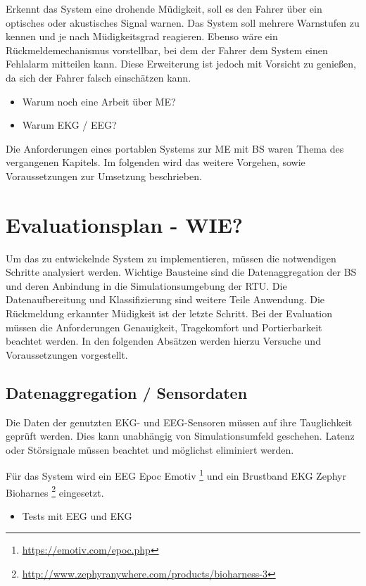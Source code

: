 {Erkennt das System eine drohende Müdigkeit, soll es den Fahrer über ein optisches oder akustisches Signal warnen. Das System soll mehrere Warnstufen zu kennen und je nach Müdigkeitsgrad reagieren. Ebenso wäre ein Rückmeldemechanismus vorstellbar, bei dem der Fahrer dem System einen Fehlalarm mitteilen kann. Diese Erweiterung ist jedoch mit Vorsicht zu genießen, da sich der Fahrer falsch einschätzen kann.

\begin{itemize}
  \item Warum noch eine Arbeit über \acl{ME}?
  \item Warum EKG / EEG?
\end{itemize}

Die Anforderungen eines portablen Systems zur \acl{ME} mit \acl{BS} waren Thema des vergangenen Kapitels. Im folgenden wird das weitere Vorgehen, sowie Voraussetzungen zur Umsetzung beschrieben.

\section{Evaluationsplan - WIE?}
\label{chap:eval}
Um das zu entwickelnde System zu implementieren, müssen die notwendigen Schritte analysiert werden. Wichtige Bausteine sind die Datenaggregation der \acl{BS} und deren Anbindung in die Simulationsumgebung der \acl{RTU}. Die Datenaufbereitung und Klassifizierung sind weitere Teile Anwendung. Die Rückmeldung erkannter Müdigkeit ist der letzte Schritt. Bei der Evaluation müssen die Anforderungen Genauigkeit, Tragekomfort und Portierbarkeit beachtet werden. In den folgenden Absätzen werden hierzu Versuche und Voraussetzungen vorgestellt.


\subsection{Datenaggregation / Sensordaten}
Die Daten der genutzten EKG- und EEG-Sensoren müssen auf ihre Tauglichkeit geprüft werden. Dies kann unabhängig von Simulationsumfeld geschehen. Latenz oder Störsignale müssen beachtet und möglichst eliminiert werden. 

Für das System wird ein EEG Epoc Emotiv \footnote{\url{https://emotiv.com/epoc.php}} und ein Brustband EKG Zephyr Bioharnes \footnote{\url{http://www.zephyranywhere.com/products/bioharness-3}} eingesetzt. \\
\begin{itemize}
	\item Tests mit EEG und EKG
\end{itemize}

}
